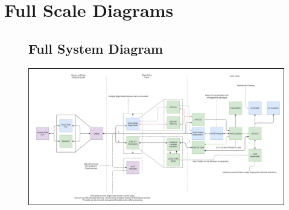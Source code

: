 \chapter{Full Scale Diagrams} 
\newpage


\begin{landscape}
\begin{figure}[ht]
\begin{minipage}{\linewidth}
\section{Full System Diagram}

   \centering
    \includegraphics[width=1\linewidth]{pages/Chapter3/Chapter 3 images/block_system_diagram_v2.png}
    
    \label{appendix:full_scale_system_diagram}

\end{minipage}
\end{figure}
    \end{landscape}
    
